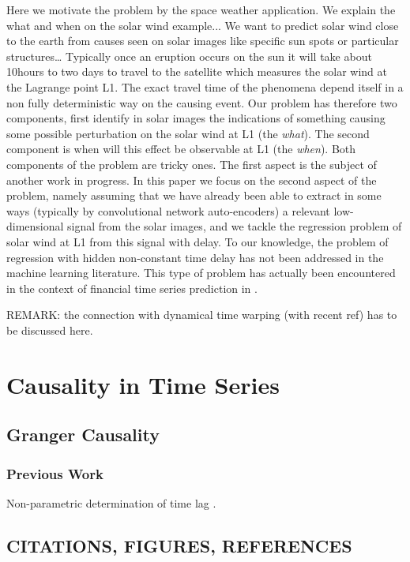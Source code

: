 \documentclass[twoside]{article}
\begin{document}
Here we motivate the problem by the space weather application. We explain the what and when on the solar wind example... We want to predict solar wind close to the earth from causes seen on solar images like specific sun spots or particular structures\ldots
Typically once an eruption occurs on the sun it will take about 10hours to two days to travel to the satellite which measures the solar wind at the Lagrange point L1. The exact travel time of the phenomena depend itself in a non fully 
deterministic way on the causing event. Our problem has therefore two components, first identify in solar images the indications of something causing some possible perturbation on the solar wind at L1 (the \emph{what}). The second component is when will this effect be observable at L1 (the \emph{when}). 
Both components of the problem are tricky ones. The first aspect is the subject of another work in progress. 
In this paper we focus on the second aspect of the problem, namely assuming that we have already been able to extract in some ways (typically by convolutional network auto-encoders) a relevant low-dimensional signal from the solar images, and we tackle the regression problem of solar wind at L1 from this signal with delay. To our knowledge, the problem of regression with hidden non-constant time delay has not been addressed in the machine learning literature. This type  of problem has actually been encountered in the context of financial time series prediction in \cite{ZHOU2006195}.

REMARK: the connection with dynamical time warping (with recent ref) has to 
be discussed here.

\section{Causality in Time Series}


\subsection{Granger Causality}


\subsubsection{Previous Work}

Non-parametric determination of time lag \cite{ZHOU2006195}.

\subsection{CITATIONS, FIGURES, REFERENCES}
\end{document}
